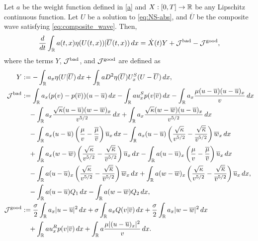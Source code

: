 \documentclass[11pt,reqno]{amsart}
\begin{document}
\begin{lemma} %
    Let $a$ be the weight function defined in \eqref{a} and $X:[0,T]\to\mathbb R$ be any Lipschitz continuous function. Let $U$ be a solution to \eqref{eq:NS-abs},  and $\overline{U}$ be the composite wave satisfying \eqref{eq:composite_wave}. Then,
\begin{equation}\label{est-weight-rel-ent} 
\frac{d}{dt}\int_\mathbb{R} a(t,x) \eta (U(t,x))|\overline{U}(t,x)) \, dx=\dot{X}(t)Y+\mathcal{J}^{\textup{bad}}-\mathcal{J}^{\textup{good}},
\end{equation}
where the terms $Y$, $\mathcal{J}^{\textup{bad}}$, and $\mathcal{J}^{\textup{good}}$ are defined as
\begin{align*}
Y&:=-\int_\mathbb{R} a_x \eta(U|\overline{U})\,d x +\int_\mathbb{R} a D^2\eta(\overline{U})U^S_x (U-\overline{U})\,d x,\\
\mathcal{J}^{\textup{bad}}&:=\int_\mathbb{R} a_x (p(v)-p(\overline{v}))(u-\overline{u}) \, dx-\int_\mathbb{R} au^S_x p(v | \overline{v}) \,d x  -\int_\mathbb{R}  a_x \frac{\mu(u-\overline{u}) (u-\overline{u})_x}{v}  \, dx\\
&\quad - \int_\mathbb{R} a_x \frac{\sqrt{\kappa} (u-\overline{u}) (w-\overline{w})_x}{v^{5/2}}  \, dx+ \int_\mathbb{R} a_x \frac{\sqrt{\kappa} (w-\overline{w})(u-\overline{u})_x}{v^{5/2}}  \, dx \\
&\quad-  \int_\mathbb{R} a_x   (u-\overline{u}) \left( \frac{\mu}{v}-\frac{\overline{\mu}}{\overline{v}} \right) \overline{u}_x \, dx 
 - \int_\mathbb{R} a_x (u-\overline{u}) \left( \frac{\sqrt{\kappa}}{v^{5/2}}-\frac{\sqrt{\overline{\kappa}}}{\overline{v}^{5/2}} \right) \overline{w}_x  \, dx  \\
 &\quad+ \int_\mathbb{R} a_x (w-\overline{w}) \left( \frac{\sqrt{\kappa}}{v^{5/2}}-\frac{\sqrt{\overline{\kappa}}}{\overline{v}^{5/2}} \right) \overline{u}_x  \, dx -  \int_\mathbb{R} a (u-\overline{u})_x \left( \frac{\mu}{v}-\frac{\overline{\mu}}{\overline{v}} \right) \overline{u}_x \, dx \\
&\quad -\int_\mathbb{R} a (u-\overline{u})_x \left( \frac{\sqrt{\kappa}}{v^{5/2}}-\frac{\sqrt{\overline{\kappa}}}{\overline{v}^{5/2}} \right) \overline{w}_x \, dx + \int_\mathbb{R} a (w-\overline{w})_x \left( \frac{\sqrt{\kappa}}{v^{5/2}}-\frac{\sqrt{\overline{\kappa}}}{\overline{v}^{5/2}} \right) \overline{u}_x \, dx,\\
&\quad-\int_\mathbb{R} a (u-\overline{u})  Q_1  \, dx -\int_\mathbb{R} a(w-\overline{w}) Q_2 \, dx ,\\
\mathcal{J}^{\textup{good}}&:= \frac{\sigma}{2}\int_\mathbb{R} a_x |u-\overline{u}|^2 \, dx +\sigma \int_\mathbb{R} a_x Q(v|\overline{v}) \, dx+\frac{\sigma}{2}\int_\mathbb{R} a_x |w-\overline{w}|^2 \, dx\\
&\quad+\int_\mathbb{R} a u^R_x p(v|\overline{v}) \, dx +  \int_\mathbb{R} a \frac{\mu|(u-\overline{u})_x|^2}{v} \,dx.
\end{align*}
\end{lemma}
\end{document}
